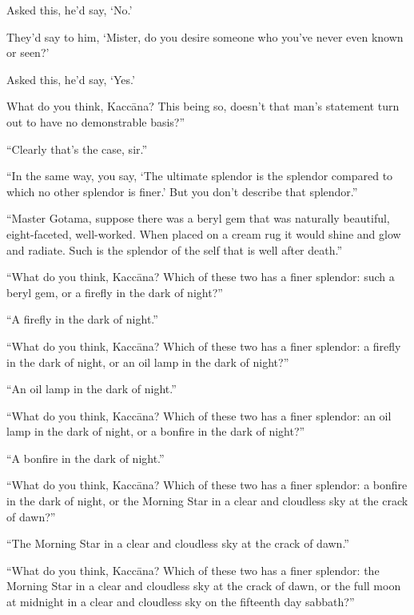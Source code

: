 \documentclass[12pt,openany]{book}%
\begin{document}
Asked this, he’d say, ‘No.’ 

They’d say to him, ‘Mister, do you desire someone who you’ve never even known or seen?’ 

Asked this, he’d say, ‘Yes.’ 

What do you think, \textsanskrit{Kaccāna}? This being so, doesn’t that man’s statement turn out to have no demonstrable basis?” 

“Clearly that’s the case, sir.” 

“In the same way, you say, ‘The ultimate splendor is the splendor compared to which no other splendor is finer.’ But you don’t describe that splendor.” 

“Master Gotama, suppose there was a beryl gem that was naturally beautiful, eight-faceted, well-worked. When placed on a cream rug it would shine and glow and radiate. Such is the splendor of the self that is well after death.” 

“What do you think, \textsanskrit{Kaccāna}? Which of these two has a finer splendor: such a beryl gem, or a firefly in the dark of night?” 

“A firefly in the dark of night.” 

“What do you think, \textsanskrit{Kaccāna}? Which of these two has a finer splendor: a firefly in the dark of night, or an oil lamp in the dark of night?” 

“An oil lamp in the dark of night.” 

“What do you think, \textsanskrit{Kaccāna}? Which of these two has a finer splendor: an oil lamp in the dark of night, or a bonfire in the dark of night?” 

“A bonfire in the dark of night.” 

“What do you think, \textsanskrit{Kaccāna}? Which of these two has a finer splendor: a bonfire in the dark of night, or the Morning Star in a clear and cloudless sky at the crack of dawn?” 

“The Morning Star in a clear and cloudless sky at the crack of dawn.” 

“What do you think, \textsanskrit{Kaccāna}? Which of these two has a finer splendor: the Morning Star in a clear and cloudless sky at the crack of dawn, or the full moon at midnight in a clear and cloudless sky on the fifteenth day sabbath?” 
\end{document}
